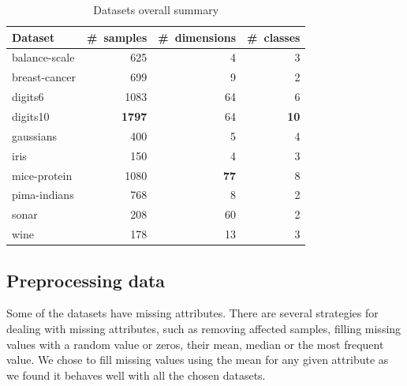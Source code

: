 \documentclass[12pt,a4paper]{report}
\begin{document}
\begin{table}[ht] \centering
\begin{tabular}{lrrr}
\hline
Dataset & \#~samples & \#~dimensions & \#~classes \\
\hline
balance-scale           & 625   & 4    & 3  \\
breast-cancer           & 699   & 9    & 2  \\
digits6                 & 1083  & 64   & 6  \\
digits10                & \textbf{1797}  & 64  & \textbf{10} \\
gaussians               & 400   & 5   & 4  \\
iris                    & 150   & 4    & 3  \\
mice-protein            & 1080  & \textbf{77}   & 8  \\
pima-indians            & 768   & 8    & 2  \\
sonar                   & 208   & 60   & 2  \\
wine                    & 178   & 13   & 3  \\
\hline
\end{tabular}
\caption{Datasets overall summary} \label{tab:datasets}
\end{table}

\subsection{Preprocessing data} \label{chap:exp:preprocessing}
Some of the datasets have missing attributes. There are several strategies for dealing with missing attributes, such as removing affected samples, filling missing values with a random value or zeros, their mean, median or the most frequent value. We chose to fill missing values using the mean for any given attribute as we found it behaves well with all the chosen datasets.
\end{document}
